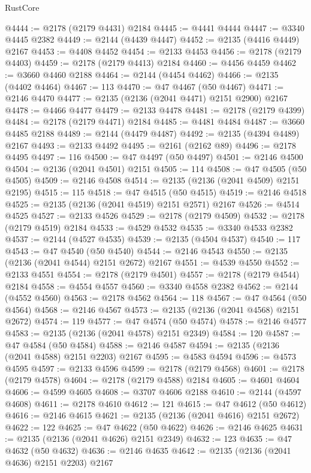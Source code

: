 \begin{lexlean}{RustCore}
\begin{coremodule}
@4444 := @2178 (@2179 @4431) @2184
@4445 := @4441 @4444
@4447 := @3340 @4445 @2382
@4449 := @2144 (@4439 @4447)
@4452 := @2135 (@4416 @4449) @2167
@4453 := @4408 @4452
@4454 := @2133 @4453
@4456 := @2178 (@2179 @4403)
@4459 := @2178 (@2179 @4413) @2184
@4460 := @4456 @4459
@4462 := @3660 @4460 @2188
@4464 := @2144 (@4454 @4462)
@4466 := @2135 (@4402 @4464)
@4467 := 113
@4470 := @47 @4467 (@50 @4467)
@4471 := @2146 @4470
@4477 := @2135 (@2136 (@2041 @4471) @2151 @2900) @2167
@4478 := @4466 @4477
@4479 := @2133 @4478
@4481 := @2178 (@2179 @4399)
@4484 := @2178 (@2179 @4471) @2184
@4485 := @4481 @4484
@4487 := @3660 @4485 @2188
@4489 := @2144 (@4479 @4487)
@4492 := @2135 (@4394 @4489) @2167
@4493 := @2133 @4492
@4495 := @2161 (@2162 @89)
@4496 := @2178 @4495
@4497 := 116
@4500 := @47 @4497 (@50 @4497)
@4501 := @2146 @4500
@4504 := @2136 (@2041 @4501) @2151
@4505 := 114
@4508 := @47 @4505 (@50 @4505)
@4509 := @2146 @4508
@4514 := @2135 (@2136 (@2041 @4509) @2151 @2195)
@4515 := 115
@4518 := @47 @4515 (@50 @4515)
@4519 := @2146 @4518
@4525 := @2135 (@2136 (@2041 @4519) @2151 @2571) @2167
@4526 := @4514 @4525
@4527 := @2133 @4526
@4529 := @2178 (@2179 @4509)
@4532 := @2178 (@2179 @4519) @2184
@4533 := @4529 @4532
@4535 := @3340 @4533 @2382
@4537 := @2144 (@4527 @4535)
@4539 := @2135 (@4504 @4537)
@4540 := 117
@4543 := @47 @4540 (@50 @4540)
@4544 := @2146 @4543
@4550 := @2135 (@2136 (@2041 @4544) @2151 @2672) @2167
@4551 := @4539 @4550
@4552 := @2133 @4551
@4554 := @2178 (@2179 @4501)
@4557 := @2178 (@2179 @4544) @2184
@4558 := @4554 @4557
@4560 := @3340 @4558 @2382
@4562 := @2144 (@4552 @4560)
@4563 := @2178 @4562
@4564 := 118
@4567 := @47 @4564 (@50 @4564)
@4568 := @2146 @4567
@4573 := @2135 (@2136 (@2041 @4568) @2151 @2672)
@4574 := 119
@4577 := @47 @4574 (@50 @4574)
@4578 := @2146 @4577
@4583 := @2135 (@2136 (@2041 @4578) @2151 @2349)
@4584 := 120
@4587 := @47 @4584 (@50 @4584)
@4588 := @2146 @4587
@4594 := @2135 (@2136 (@2041 @4588) @2151 @2203) @2167
@4595 := @4583 @4594
@4596 := @4573 @4595
@4597 := @2133 @4596
@4599 := @2178 (@2179 @4568)
@4601 := @2178 (@2179 @4578)
@4604 := @2178 (@2179 @4588) @2184
@4605 := @4601 @4604
@4606 := @4599 @4605
@4608 := @3707 @4606 @2188
@4610 := @2144 (@4597 @4608)
@4611 := @2178 @4610
@4612 := 121
@4615 := @47 @4612 (@50 @4612)
@4616 := @2146 @4615
@4621 := @2135 (@2136 (@2041 @4616) @2151 @2672)
@4622 := 122
@4625 := @47 @4622 (@50 @4622)
@4626 := @2146 @4625
@4631 := @2135 (@2136 (@2041 @4626) @2151 @2349)
@4632 := 123
@4635 := @47 @4632 (@50 @4632)
@4636 := @2146 @4635
@4642 := @2135 (@2136 (@2041 @4636) @2151 @2203) @2167

\end{coremodule}
\end{lexlean}
